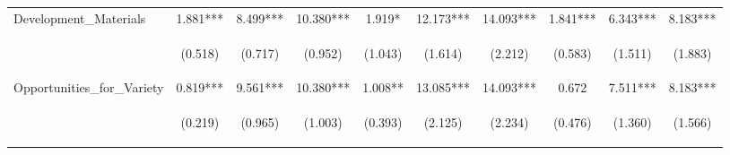 \begin{tabular}{lccccccccc}
\noalign{\smallskip}Development_Materials & 1.881*** & 8.499*** & 10.380*** & 1.919* & 12.173*** & 14.093*** & 1.841*** & 6.343*** & 8.183***\\
 & \begin{footnotesize}(0.518)\end{footnotesize} & \begin{footnotesize}(0.717)\end{footnotesize} & \begin{footnotesize}(0.952)\end{footnotesize} & \begin{footnotesize}(1.043)\end{footnotesize} & \begin{footnotesize}(1.614)\end{footnotesize} & \begin{footnotesize}(2.212)\end{footnotesize} & \begin{footnotesize}(0.583)\end{footnotesize} & \begin{footnotesize}(1.511)\end{footnotesize} & \begin{footnotesize}(1.883)\end{footnotesize}\\
\noalign{\smallskip}Opportunities_for_Variety & 0.819*** & 9.561*** & 10.380*** & 1.008** & 13.085*** & 14.093*** & 0.672 & 7.511*** & 8.183***\\
 & \begin{footnotesize}(0.219)\end{footnotesize} & \begin{footnotesize}(0.965)\end{footnotesize} & \begin{footnotesize}(1.003)\end{footnotesize} & \begin{footnotesize}(0.393)\end{footnotesize} & \begin{footnotesize}(2.125)\end{footnotesize} & \begin{footnotesize}(2.234)\end{footnotesize} & \begin{footnotesize}(0.476)\end{footnotesize} & \begin{footnotesize}(1.360)\end{footnotesize} & \begin{footnotesize}(1.566)\end{footnotesize}\\

\end{tabular}
